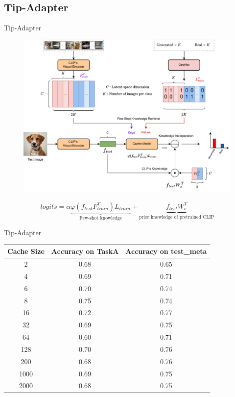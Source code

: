 \documentclass[11pt,compress]{beamer} %
\begin{document}
\subsection{Tip-Adapter}
\begin{frame}{Tip-Adapter}
  \begin{figure}
    \includegraphics[height=.7\textheight]{img/tip_adapter_binary.png}
  \end{figure}
  \begin{equation}
    logits = \alpha\underbrace{\varphi(f_{test}F_{train}^T)L_{train}}_{\text{Few-shot knowledge}} + \underbrace{f_{test}W_c^T}_{\text{prior knowledge of pretrained CLIP}} \nonumber
  \end{equation}
\end{frame}

\begin{frame}{Tip-Adapter}
    \begin{table}[H]
      \centering
      \begin{tabular}{|c|c|c|}
      \hline
      \textbf{Cache Size} & \textbf{Accuracy on TaskA} & \textbf{Accuracy on test\_meta} \\ \hline
      2    & 0.68 & 0.65 \\ \hline
      4    & 0.69 & 0.71 \\ \hline
      6    & 0.70 & 0.74 \\ \hline
      8    & 0.75 & 0.74 \\ \hline
      16   & 0.72 & 0.77 \\ \hline
      32   & 0.69 & 0.75 \\ \hline
      64   & 0.60 & 0.71 \\ \hline
      128  & 0.70 & 0.76 \\ \hline
      200  & 0.68 & 0.76 \\ \hline
      1000 & 0.69 & 0.75 \\ \hline
      2000 & 0.68 & 0.75 \\ \hline
      \end{tabular}
      \label{tab:cache}
    \end{table}  
  \end{frame}
\end{document}

